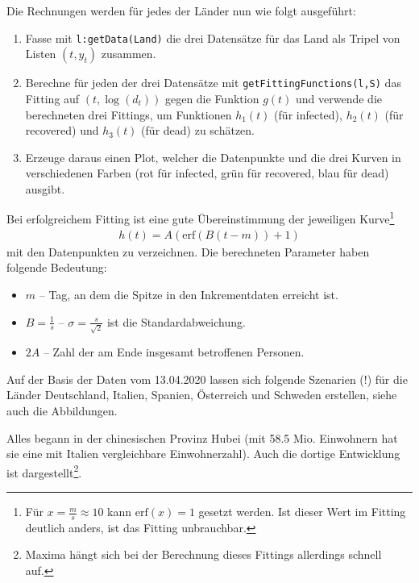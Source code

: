 \documentclass[a4paper,11pt]{article}
\newcommand{\br}[1]{\left(#1\right)}
\newcommand{\erf}{\mathrm{erf}}
\begin{document}
Die Rechnungen werden für jedes der Länder nun wie folgt ausgeführt:
\begin{enumerate}
\item Fasse mit \texttt{l:getData(Land)} die drei Datensätze für das Land als
  Tripel von Listen $(t,y_t)$ zusammen.
\item Berechne für jeden der drei Datensätze mit
  \texttt{getFittingFunctions(l,S)} das Fitting auf $(t,\log(d_t))$ gegen die
  Funktion $g(t)$ und verwende die berechneten drei Fittings, um Funktionen
  $h_1(t)$ (für infected), $h_2(t)$ (für recovered) und $h_3(t)$ (für dead) zu
  schätzen.
\item Erzeuge daraus einen Plot, welcher die Datenpunkte und die drei Kurven
  in verschiedenen Farben (rot für infected, grün für recovered, blau für
  dead) ausgibt.  
\end{enumerate}
Bei erfolgreichem Fitting ist eine gute Übereinstimmung der jeweiligen
Kurve\footnote{Für $x=\frac{m}{s}\approx 10$ kann $\erf(x)=1$ gesetzt werden.
Ist dieser Wert im Fitting deutlich anders, ist das Fitting unbrauchbar.}
\begin{gather*}
  h(t)=A\br{\erf\br{B(t-m)}+1}
\end{gather*}
mit den Datenpunkten zu verzeichnen.  Die berechneten Parameter haben folgende
Bedeutung:
\begin{itemize}
\item $m$ -- Tag, an dem die Spitze in den Inkrementdaten erreicht ist.
\item $B=\frac{1}{s}$ -- $\sigma=\frac{s}{\sqrt{2}}$ ist die
  Standardabweichung.
\item $2A$ -- Zahl der am Ende insgesamt betroffenen Personen. 
\end{itemize}

Auf der Basis der Daten vom 13.04.2020 lassen sich folgende Szenarien (!) für
die Länder Deutschland, Italien, Spanien, Österreich und Schweden erstellen,
siehe auch die Abbildungen.

Alles begann in der chinesischen Provinz Hubei (mit 58.5 Mio. Einwohnern hat
sie eine mit Italien vergleichbare Einwohnerzahl).  Auch die dortige
Entwicklung ist dargestellt\footnote{Maxima hängt sich bei der Berechnung
  dieses Fittings allerdings schnell auf.}.
\end{document}
